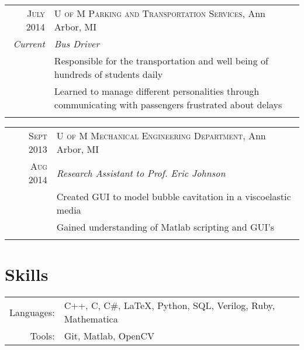 \documentclass[a4paper,10pt]{article} %
\begin{document}
\begin{tabular}{r|p{13cm}}
\textsc{July 2014} & \textsc{U of M Parking and Transportation Services}, Ann Arbor, MI\\
\emph{Current} & \emph{Bus Driver} \\
& \footnotesize{Responsible for the transportation and well being of hundreds
  of students daily} \\
& \footnotesize{Learned to manage different personalities through communicating
  with passengers frustrated about delays} \\
\multicolumn{2}{c}{} \\
\end{tabular}


\begin{tabular}{r|p{13cm}}
\textsc{Sept 2013} & \textsc{U of M Mechanical Engineering Department}, Ann Arbor, MI \\
\textsc{Aug 2014} & \emph{Research Assistant to Prof. Eric Johnson} \\
& \footnotesize{Created GUI to model bubble cavitation in a viscoelastic media} \\
& \footnotesize{Gained understanding of Matlab scripting and GUI's} \\
\multicolumn{2}{c}{} \\
\end{tabular}



\section{Skills}

\begin{tabular}{rl}
Languages: & C++, C, C\#, \LaTeX, Python, SQL, Verilog, Ruby, Mathematica \\
Tools: & Git, Matlab, OpenCV
\end{tabular}

\clearpage %
\end{document}
